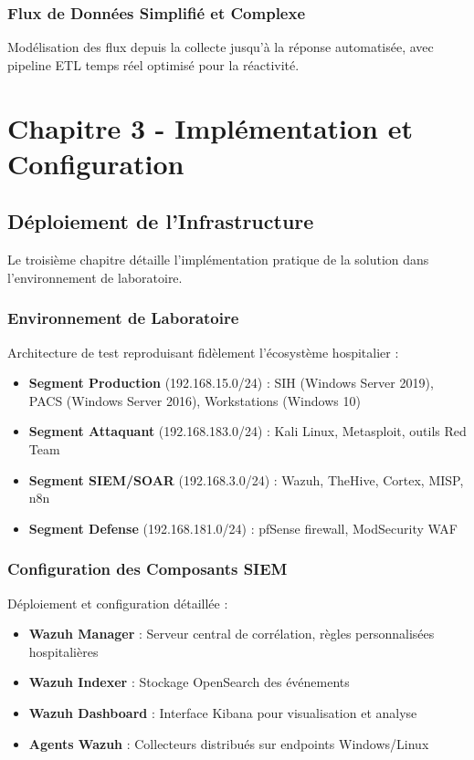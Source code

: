 \subsubsection{Flux de Données Simplifié et Complexe}
Modélisation des flux depuis la collecte jusqu'à la réponse automatisée, avec pipeline ETL temps réel optimisé pour la réactivité.

\section{Chapitre 3 - Implémentation et Configuration}

\subsection{Déploiement de l'Infrastructure}

Le troisième chapitre détaille l'implémentation pratique de la solution dans l'environnement de laboratoire.

\subsubsection{Environnement de Laboratoire}
Architecture de test reproduisant fidèlement l'écosystème hospitalier :
\begin{itemize}
    \item \textbf{Segment Production} (192.168.15.0/24) : SIH (Windows Server 2019), PACS (Windows Server 2016), Workstations (Windows 10)
    \item \textbf{Segment Attaquant} (192.168.183.0/24) : Kali Linux, Metasploit, outils Red Team
    \item \textbf{Segment SIEM/SOAR} (192.168.3.0/24) : Wazuh, TheHive, Cortex, MISP, n8n
    \item \textbf{Segment Defense} (192.168.181.0/24) : pfSense firewall, ModSecurity WAF
\end{itemize}

\subsubsection{Configuration des Composants SIEM}
Déploiement et configuration détaillée :
\begin{itemize}
    \item \textbf{Wazuh Manager} : Serveur central de corrélation, règles personnalisées hospitalières
    \item \textbf{Wazuh Indexer} : Stockage OpenSearch des événements
    \item \textbf{Wazuh Dashboard} : Interface Kibana pour visualisation et analyse
    \item \textbf{Agents Wazuh} : Collecteurs distribués sur endpoints Windows/Linux
\end{itemize}

